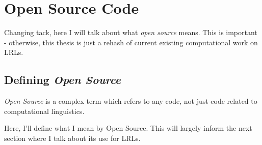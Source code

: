 \section{Open Source Code}\label{sec:open-source}

Changing tack, here I will talk about what \emph{open source} means. This is important - otherwise, this thesis is just a rehash of current existing computational work on LRLs.

\subsection{Defining {\it Open Source}}

{\it Open Source} is a complex term which refers to any code, not just code related to computational linguistics.

Here, I'll define what I mean by Open Source. This will largely inform the next section where I talk about its use for LRLs.




